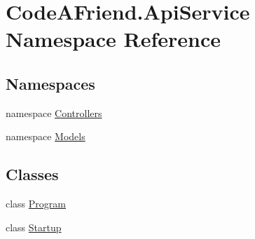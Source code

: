 \hypertarget{namespace_code_a_friend_1_1_api_service}{}\section{Code\+A\+Friend.\+Api\+Service Namespace Reference}
\label{namespace_code_a_friend_1_1_api_service}
\subsection*{Namespaces}
\begin{DoxyCompactItemize}
\item 
namespace \mbox{\hyperlink{namespace_code_a_friend_1_1_api_service_1_1_controllers}{Controllers}}
\item 
namespace \mbox{\hyperlink{namespace_code_a_friend_1_1_api_service_1_1_models}{Models}}
\end{DoxyCompactItemize}
\subsection*{Classes}
\begin{DoxyCompactItemize}
\item 
class \mbox{\hyperlink{class_code_a_friend_1_1_api_service_1_1_program}{Program}}
\item 
class \mbox{\hyperlink{class_code_a_friend_1_1_api_service_1_1_startup}{Startup}}
\end{DoxyCompactItemize}
